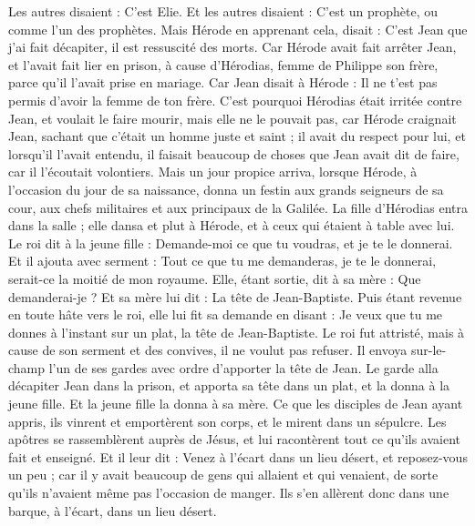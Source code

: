 \begin{multicols}{2}
Les autres disaient : C'est Elie. Et les autres disaient : C'est un prophète, ou comme l'un des prophètes.
Mais Hérode en apprenant cela, disait : C'est Jean que j'ai fait décapiter, il est ressuscité des morts.
Car Hérode avait fait arrêter Jean, et l'avait fait lier en prison, à cause d'Hérodias, femme de Philippe son frère, parce qu'il l'avait prise en mariage.
Car Jean disait à Hérode : Il ne t'est pas permis d'avoir la femme de ton frère.
C'est pourquoi Hérodias était irritée contre Jean, et voulait le faire mourir,
mais elle ne le pouvait pas, car Hérode craignait Jean, sachant que c'était un homme juste et saint ; il avait du respect pour lui, et lorsqu'il l'avait entendu, il faisait beaucoup de choses que Jean avait dit de faire, car il l'écoutait volontiers.
 Mais un jour propice arriva, lorsque Hérode, à l'occasion du jour de sa naissance, donna un festin aux grands seigneurs de sa cour, aux chefs militaires et aux principaux de la Galilée.
La fille d'Hérodias entra dans la salle ; elle dansa et plut à Hérode, et à ceux qui étaient à table avec lui. Le roi dit à la jeune fille : Demande-moi ce que tu voudras, et je te le donnerai.
Et il ajouta avec serment : Tout ce que tu me demanderas, je te le donnerai, serait-ce la moitié de mon royaume.
Elle, étant sortie, dit à sa mère : Que demanderai-je ? Et sa mère lui dit : La tête de Jean-Baptiste.
Puis étant revenue en toute hâte vers le roi, elle lui fit sa demande en disant : Je veux que tu me donnes à l'instant sur un plat, la tête de Jean-Baptiste.
Le roi fut attristé, mais à cause de son serment et des convives, il ne voulut pas refuser.
Il envoya sur-le-champ l'un de ses gardes avec ordre d'apporter la tête de Jean.
Le garde alla décapiter Jean dans la prison, et apporta sa tête dans un plat, et la donna à la jeune fille. Et la jeune fille la donna à sa mère.
Ce que les disciples de Jean ayant appris, ils vinrent et emportèrent son corps, et le mirent dans un sépulcre.
Les apôtres se rassemblèrent auprès de Jésus, et lui racontèrent tout ce qu'ils avaient fait et enseigné.
Et il leur dit : Venez à l'écart dans un lieu désert, et reposez-vous un peu ; car il y avait beaucoup de gens qui allaient et qui venaient, de sorte qu'ils n'avaient même pas l'occasion de manger.
Ils s'en allèrent donc dans une barque, à l'écart, dans un lieu désert.

\end{multicols}
